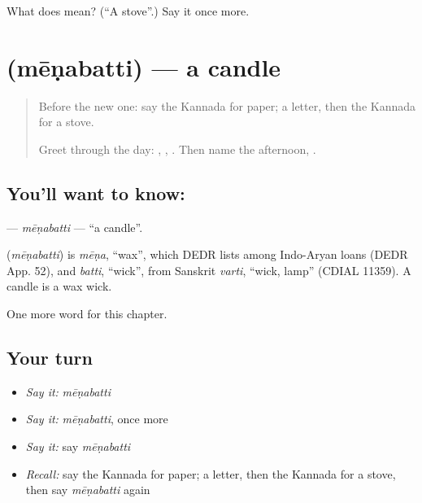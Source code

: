 \begin{tcolorbox}[breakable,colback=teal!4,colframe=teal!35!black,title={Before you move on}]
What does  mean? (\textquotedblleft{}A stove\textquotedblright{}.) Say it once more.
\end{tcolorbox}
\section[\texorpdfstring{\kn{ಮೇಣಬತ್ತಿ} (mēṇabatti)}{ಮೇಣಬತ್ತಿ (mēṇabatti)}]{ (mēṇabatti) — a candle}

\label{lesson:KA-C119-menabatti}



\begin{quote}
Before the new one: say the Kannada for paper; a letter, then the Kannada for a stove.

Greet through the day: \textbf{}, \textbf{ }, \textbf{ }. Then name the afternoon, \textbf{}.
\end{quote}

\subsection*{You'll want to know: }
\textbf{} — \emph{mēṇabatti} — \textquotedblleft{}a candle\textquotedblright{}.

\begin{cousinweb}
\textbf{} (\emph{mēṇabatti}) is \emph{mēṇa}, \textquotedblleft{}wax\textquotedblright{}, which DEDR lists among Indo-Aryan loans (DEDR App. 52), and \emph{batti}, \textquotedblleft{}wick\textquotedblright{}, from Sanskrit \emph{varti}, \textquotedblleft{}wick, lamp\textquotedblright{} (CDIAL 11359). A candle is a wax wick.
\end{cousinweb}

\begin{grammarlens}[title={What you've built}]
One more word for this chapter.
\end{grammarlens}

\subsection*{Your turn}
\begin{itemize}
\raggedright
  \item \emph{Say it:} \emph{mēṇabatti}
  \item \emph{Say it:} \emph{mēṇabatti}, once more
  \item \emph{Say it:} say \emph{mēṇabatti}
  \item \emph{Recall:} say the Kannada for paper; a letter, then the Kannada for a stove, then say \emph{mēṇabatti} again
\end{itemize}

